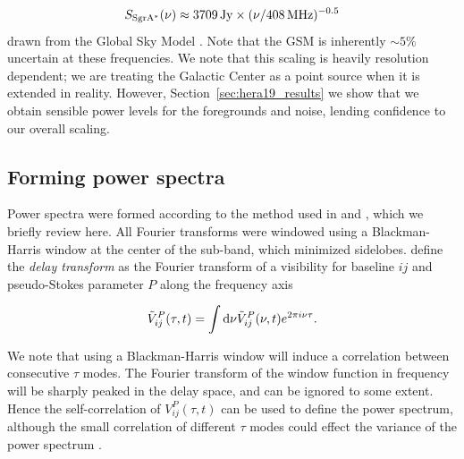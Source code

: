 \begin{equation}
S_{\rm Sgr A^*}(\nu) \approx  3709 {\rm\, Jy} \times (\nu/408 {\rm \,MHz})^{-0.5}
\label{eq:freq_scale}
\end{equation}
drawn from the Global Sky Model \citep[GSM;][]{GSM.08,pygsm,GSM.17}. Note that the GSM is inherently $\sim 5\%$ uncertain at these frequencies. We note that this scaling is heavily resolution dependent; we are treating the Galactic Center as a point source when it is extended in reality. However, Section~\ref{sec:hera19_results} we show that we obtain sensible power levels for the foregrounds and noise, lending confidence to our overall scaling.

\subsection{Forming power spectra}
\label{subsec:hera19_pspec}

Power spectra were formed according to the method used in \cite{Pober.13} and \cite{Kohn.16}, which we briefly review here. All Fourier transforms were windowed using a Blackman-Harris window at the center of the sub-band, which minimized sidelobes. \cite{Parsons.12a} define the \textit{delay transform} as the Fourier transform of a visibility for baseline $ij$ and pseudo-Stokes parameter $P$ along the frequency axis

\begin{equation}
\tilde{V}_{ij}^{P}(\tau, t) = \int {\rm d}\nu \tilde{V}_{ij}^{P}(\nu, t)e^{2\pi i \nu \tau}.
\end{equation}

We note that using a Blackman-Harris window will induce a correlation between consecutive $\tau$ modes. The Fourier transform of the window function in frequency will be sharply peaked in the delay space, and can be ignored to some extent. Hence the self-correlation of $V_{ij}^{P}(\tau, t)$ can be used to define the power spectrum, although the small correlation of different $\tau$ modes could effect the variance of the power spectrum \citep{Parsons.14}.

